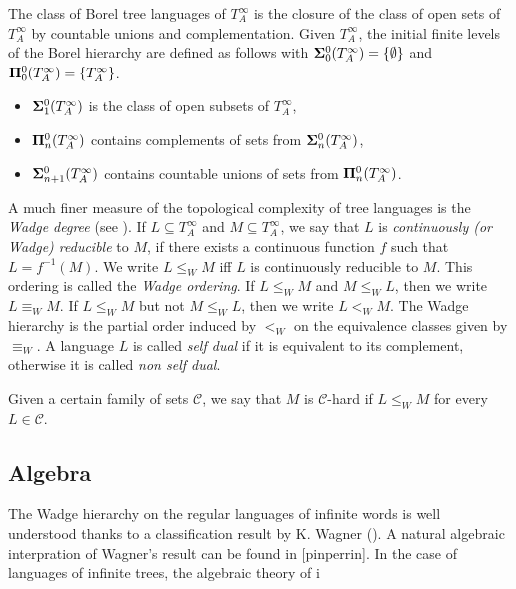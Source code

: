 The class of Borel tree languages of $T^\infty_A$ is the
closure of the class of open sets of $T^\infty_A$ by countable unions and
complementation. Given $T^\infty_A$, the initial finite levels of the
Borel hierarchy are defined as follows with ${\bf\Sigma}^0_0(T^\infty_A)= \{\emptyset\}$ and
${\bf\Pi}^0_0(T^\infty_A)=\{T^\infty_A \}$.
\begin{itemize}
\item ${\bf\Sigma}^0_1(T^\infty_A)$ is the class of open subsets of $T^\infty_A$, 
\item ${\bf\Pi}^0_n(T^\infty_A)$ contains complements of sets from ${\bf\Sigma}^0_n(T^\infty_A)$, 
\item ${\bf\Sigma}^0_{n+1}(T^\infty_A)$ contains countable unions of sets from ${\bf\Pi}^0_n(T^\infty_A)$. 
\end{itemize}

A much finer measure of the topological complexity of tree languages is the \emph{Wadge degree} (see \cite[Chapter 21.E]{kechris}).
If $L \subseteq T^\infty_A$ and $M\subseteq T^\infty_A$,   we say that $L$ is \emph{continuously (or Wadge)
reducible} to $M$, if there exists a continuous function $f$ such that $L=
f^{-1}(M)$. We write $L \leq_W M$ iff $L$ is continuously reducible to $M$.
This ordering is called the {\em Wadge ordering}. If $L \leq_W M$ and $M \leq_W L$, then we write $L
\equiv_W M$. If $L \leq_W M$ but not $M \leq_W L$, then we write $L<_W
M$. The Wadge hierarchy is the partial order induced by $<_W$ on the
equivalence classes given by $\equiv_W$. A language  $L$ is called {\em self dual} if it is equivalent 
to its complement, otherwise it is called {\em non self dual}.


Given a certain family of sets $\mathcal{C}$, we say that $M$ is $\mathcal{C}$-hard if $L
\leq_W M$ for every $L \in \mathcal{C}$.   

\subsection{Algebra}
The Wadge hierarchy on the regular languages of infinite words is well understood thanks to a classification result by K. Wagner (\cite{wagner}). A natural algebraic interpration of Wagner's result can be found in \cite{Theorem 6.2}[pinperrin]. In the case of languages of infinite trees, the algebraic theory of i
